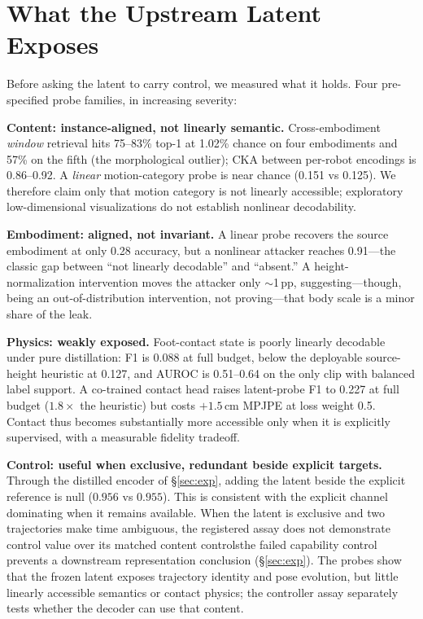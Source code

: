 \documentclass[conference]{IEEEtran}
\newif\ifeexplicitvalid
\newif\ifepositivecontent
\begin{document}
\section{What the Upstream Latent Exposes}
\label{sec:audit}
Before asking the latent to carry control, we measured what it holds. Four pre-specified
probe families, in increasing severity:

\textbf{Content: instance-aligned, not linearly semantic.} Cross-embodiment
\emph{window} retrieval hits 75--83\% top-1 at 1.02\% chance on four embodiments and
57\% on the fifth (the morphological outlier); CKA between per-robot encodings is
0.86--0.92. A \emph{linear} motion-category probe is near chance (0.151 vs 0.125).
We therefore claim only that motion category is not linearly accessible; exploratory
low-dimensional visualizations do not establish nonlinear decodability.

\textbf{Embodiment: aligned, not invariant.} A linear probe recovers the source
embodiment at only 0.28 accuracy, but a nonlinear attacker reaches 0.91---the classic
gap between ``not linearly decodable'' and ``absent.'' A height-normalization
intervention moves the attacker only $\sim$1\,pp, suggesting---though, being an
out-of-distribution intervention, not proving---that body scale is a minor share of
the leak.

\textbf{Physics: weakly exposed.} Foot-contact state is poorly linearly decodable under
pure distillation: F1 is 0.088 at full budget, below the deployable source-height
heuristic at 0.127, and AUROC is 0.51--0.64 on the only clip with balanced label
support. A co-trained contact head raises latent-probe F1 to 0.227 at full budget
($1.8\times$ the heuristic) but costs $+1.5$\,cm MPJPE at loss weight 0.5.  Contact thus
becomes substantially more accessible only when it is explicitly supervised, with a
measurable fidelity tradeoff.

\textbf{Control: useful when exclusive, redundant beside explicit targets.} Through the
distilled encoder of \S\ref{sec:exp}, adding the latent beside the explicit reference is
null ($0.956$ vs $0.955$).  This is consistent with the explicit channel dominating
when it remains available.  When the latent is exclusive and two
trajectories make time
ambiguous, \ifeexplicitvalid\ifepositivecontent its instance-aligned structure becomes
control-usable\else the registered assay does not demonstrate control value over its
matched content controls\fi\else the failed capability control prevents a downstream
representation conclusion\fi{} (\S\ref{sec:exp}).  The probes show that the frozen latent
exposes trajectory identity and pose evolution, but little linearly accessible
semantics or contact physics; the controller assay separately tests whether the decoder
can use that content.
\end{document}
